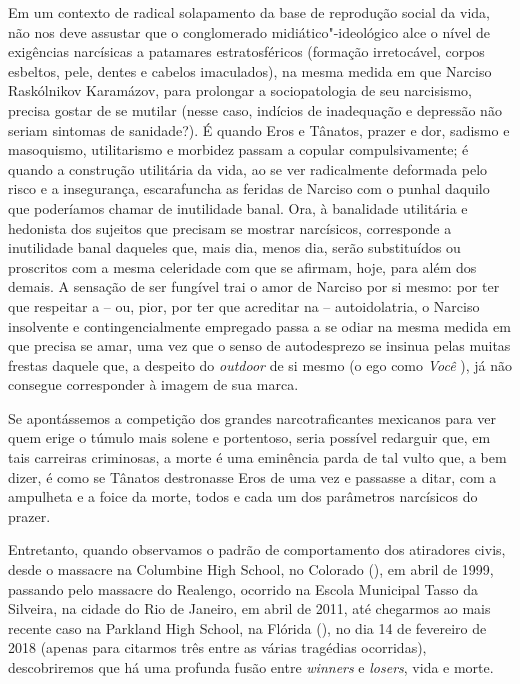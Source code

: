 Em um contexto de radical solapamento da base de reprodução social da
vida, não nos deve assustar que o conglomerado midiático"-ideológico alce
o nível de exigências narcísicas a patamares estratosféricos (formação
irretocável, corpos esbeltos, pele, dentes e cabelos imaculados), na
mesma medida em que Narciso Raskólnikov Karamázov, para prolongar a
sociopatologia de seu narcisismo, precisa gostar de se mutilar (nesse
caso, indícios de inadequação e depressão não seriam sintomas de
sanidade?). É quando Eros e Tânatos, prazer e dor, sadismo e masoquismo,
utilitarismo e morbidez passam a copular compulsivamente; é quando a
construção utilitária da vida, ao se ver radicalmente deformada pelo
risco e a insegurança, escarafuncha as feridas de Narciso com o punhal
daquilo que poderíamos chamar de inutilidade banal. Ora, à banalidade
utilitária e hedonista dos sujeitos que precisam se mostrar narcísicos,
corresponde a inutilidade banal daqueles que, mais dia, menos dia, serão
substituídos ou proscritos com a mesma celeridade com que se afirmam,
hoje, para além dos demais. A sensação de ser fungível trai o amor de
Narciso por si mesmo: por ter que respeitar a -- ou, pior, por ter que
acreditar na -- autoidolatria, o Narciso insolvente e contingencialmente
empregado passa a se odiar na mesma medida em que precisa se amar, uma
vez que o senso de autodesprezo se insinua pelas muitas frestas daquele
que, a despeito do \emph{outdoor} de si mesmo (o ego como \emph{Você
}), já não consegue corresponder à imagem de sua marca.

Se apontássemos a competição dos grandes narcotraficantes mexicanos para
ver quem erige o túmulo mais solene e portentoso, seria possível
redarguir que, em tais carreiras criminosas, a morte é uma eminência
parda de tal vulto que, a bem dizer, é como se Tânatos destronasse Eros
de uma vez e passasse a ditar, com a ampulheta e a foice da morte, todos
e cada um dos parâmetros narcísicos do prazer.

Entretanto, quando observamos o padrão de comportamento dos atiradores
civis, desde o massacre na Columbine High School, no Colorado (), em
abril de 1999, passando pelo massacre do Realengo, ocorrido na Escola
Municipal Tasso da Silveira, na cidade do Rio de Janeiro, em abril de
2011, até chegarmos ao mais recente caso na Parkland High School, na
Flórida (), no dia 14 de fevereiro de 2018 (apenas para citarmos três
entre as várias tragédias ocorridas), descobriremos que há uma profunda
fusão entre \emph{winners} e \emph{losers}, vida e morte.

